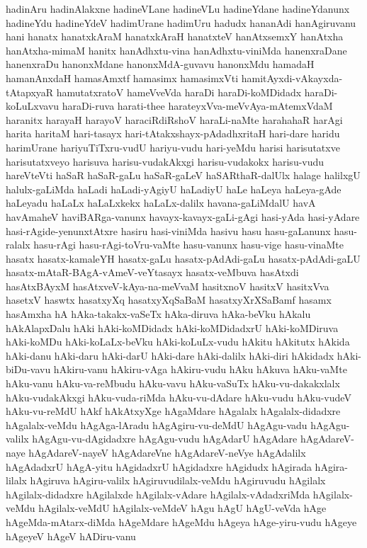 {hadinAru
hadinAlakxne
hadineVLane
hadineVLu
hadineYdane
hadineYdanunx
hadineYdu
hadineYdeV
hadimUrane
hadimUru
hadudx
hananAdi
hanAgiruvanu
hani
hanatx
hanatxkAraM
hanatxkAraH
hanatxteV
hanAtxsemxY
hanAtxha
hanAtxha-mimaM
hanitx
hanAdhxtu-vina
hanAdhxtu-viniMda
hanenxraDane
hanenxraDu
hanonxMdane
hanonxMdA-guvavu
hanonxMdu
hamadaH
hamanAnxdaH
hamasAmxtf
hamasimx
hamasimxVti
hamitAyxdi-vAkayxda-tAtapxyaR
hamutatxratoV
hameVveVda
haraDi
haraDi-koMDidadx
haraDi-koLuLxvavu
haraDi-ruva
harati-thee
harateyxVva-meVvAya-mAtemxVdaM
haranitx
harayaH
harayoV
haraciRdiRshoV
haraLi-naMte
harahahaR
harAgi
harita
haritaM
hari-tasayx
hari-tAtakxshayx-pAdadhxritaH
hari-dare
haridu
harimUrane
hariyuTiTxru-vudU
hariyu-vudu
hari-yeMdu
harisi
harisutatxve
harisutatxveyo
harisuva
harisu-vudakAkxgi
harisu-vudakokx
harisu-vudu
hareVteVti
haSaR
haSaR-gaLu
haSaR-gaLeV
haSARthaR-dalUlx
halage
halilxgU
halulx-gaLiMda
haLadi
haLadi-yAgiyU
haLadiyU
haLe
haLeya
haLeya-gAde
haLeyadu
haLaLx
haLaLxkekx
haLaLx-dalilx
havana-gaLiMdalU
havA
havAmaheV
haviBARga-vanunx
havayx-kavayx-gaLi-gAgi
hasi-yAda
hasi-yAdare
hasi-rAgide-yenunxtAtxre
hasiru
hasi-viniMda
hasivu
hasu
hasu-gaLanunx
hasu-ralalx
hasu-rAgi
hasu-rAgi-toVru-vaMte
hasu-vanunx
hasu-vige
hasu-vinaMte
hasatx
hasatx-kamaleYH
hasatx-gaLu
hasatx-pAdAdi-gaLu
hasatx-pAdAdi-gaLU
hasatx-mAtaR-BAgA-vAmeV-veYtasayx
hasatx-veMbuva
hasAtxdi
hasAtxBAyxM
hasAtxveV-kAya-na-meVvaM
hasitxnoV
hasitxV
hasitxVva
hasetxV
haswtx
hasatxyXq
hasatxyXqSaBaM
hasatxyXrXSaBamf
hasamx
hasAmxha
hA
hAka-takakx-vaSeTx
hAka-diruva
hAka-beVku
hAkalu
hAkAlapxDalu
hAki
hAki-koMDidadx
hAki-koMDidadxrU
hAki-koMDiruva
hAki-koMDu
hAki-koLaLx-beVku
hAki-koLuLx-vudu
hAkitu
hAkitutx
hAkida
hAki-danu
hAki-daru
hAki-darU
hAki-dare
hAki-dalilx
hAki-diri
hAkidadx
hAki-biDu-vavu
hAkiru-vanu
hAkiru-vAga
hAkiru-vudu
hAku
hAkuva
hAku-vaMte
hAku-vanu
hAku-va-reMbudu
hAku-vavu
hAku-vaSuTx
hAku-vu-dakakxlalx
hAku-vudakAkxgi
hAku-vuda-riMda
hAku-vu-dAdare
hAku-vudu
hAku-vudeV
hAku-vu-reMdU
hAkf
hAkAtxyXge
hAgaMdare
hAgalalx
hAgalalx-didadxre
hAgalalx-veMdu
hAgAga-lAradu
hAgAgiru-vu-deMdU
hAgAgu-vadu
hAgAgu-valilx
hAgAgu-vu-dAgidadxre
hAgAgu-vudu
hAgAdarU
hAgAdare
hAgAdareV-naye
hAgAdareV-nayeV
hAgAdareVne
hAgAdareV-neVye
hAgAdalilx
hAgAdadxrU
hAgA-yitu
hAgidadxrU
hAgidadxre
hAgidudx
hAgirada
hAgira-lilalx
hAgiruva
hAgiru-valilx
hAgiruvudilalx-veMdu
hAgiruvudu
hAgilalx
hAgilalx-didadxre
hAgilalxde
hAgilalx-vAdare
hAgilalx-vAdadxriMda
hAgilalx-veMdu
hAgilalx-veMdU
hAgilalx-veMdeV
hAgu
hAgU
hAgU-veVda
hAge
hAgeMda-mAtarx-diMda
hAgeMdare
hAgeMdu
hAgeya
hAge-yiru-vudu
hAgeye
hAgeyeV
hAgeV
hADiru-vanu
}
